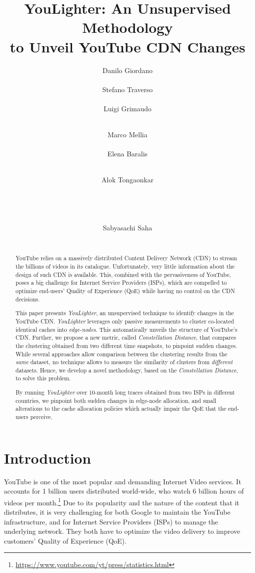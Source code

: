 \documentclass{acm_proc_article-sp}
\title{YouLighter: An Unsupervised Methodology\\
to Unveil YouTube CDN Changes}
\author{
\alignauthor Danilo Giordano\\
       \affaddr{DET, Politecnico di Torino, Italy}\\
       \email{danilo.giordano@polito.it}
\alignauthor Stefano Traverso\\
       \affaddr{DET, Politecnico di Torino, Italy}\\
       \email{stefano.traverso@polito.it}
\alignauthor Luigi Grimaudo\\
       \affaddr{DAUIN, Politecnico di Torino, Italy}\\
       \email{luigi.grimaudo@polito.it} \and
\alignauthor Marco Mellia\\
       \affaddr{DET, Politecnico di Torino, Italy}\\
       \email{marco.mellia@polito.it}
\alignauthor Elena Baralis\\
       \affaddr{DAUIN, Politecnico di Torino, Italy}\\
       \email{elena.baralis@polito.it} \and 
\alignauthor \hspace{-0pt}Alok Tongaonkar\\
       \affaddr{\hspace{-0pt}Symantec, USA}\\
\email{\vspace{-2pt}alok\_tongaonkar@symantec.com} 
\alignauthor \textcolor{white}{.}\\
       \affaddr{\textcolor{white}{.}}\\
       \email{\textcolor{white}{.}}\\
\alignauthor  Sabyasachi Saha\\
       \affaddr{Symantec, USA}\\
\email{sabyasachi\_saha@symantec.com}
}
\newcommand{\tool}{\textit{YouLighter}\xspace}
\newcommand{\distance}{\textit{Constellation Distance}\xspace}
\newcommand{\node}{{edge-node}\xspace}
\newcommand{\nodes}{{edge-nodes}\xspace}
\begin{document}
\maketitle
\begin{abstract} 
YouTube relies on a massively distributed Content Delivery Network (CDN)
to stream the billions of videos in its catalogue.  Unfortunately,  very little information about the design of such CDN is available. This, combined with the pervasiveness of YouTube, poses a big challenge for Internet Service
Providers (ISPs), which are compelled to optimize end-users' Quality of Experience (QoE) while having no control on the CDN decisions.

This paper presents \tool, an
unsupervised technique to identify changes in the
YouTube CDN. \tool leverages only passive
measurements to cluster co-located identical caches
into {\em \nodes}. This automatically unveils the structure of YouTube's CDN. Further, we propose a new metric, called {\em \distance}, that compares the clustering obtained from two different time snapshots, to pinpoint sudden changes.
While several approaches allow comparison between the clustering results from the {\em same} dataset,
no technique allows to measure the similarity of clusters from {\em different} datasets.
Hence, we develop a novel methodology, based on the \distance, to solve this problem.

By running \tool over 10-month long traces obtained from two ISPs in different countries,
we pinpoint both sudden changes in \node allocation, and small alterations to the cache allocation policies which actually impair the QoE that the end-users perceive.
\end{abstract}



\section{Introduction}
\label{sec:intro}

YouTube is one of the most popular and demanding Internet Video services. It accounts for 1 billion users distributed world-wide, who watch 6 billion hours of videos per month.\footnote{\url{https://www.youtube.com/yt/press/statistics.html}}
Due to its popularity and the nature of the content that it distributes, it is very challenging for both Google to maintain the YouTube infrastructure, and for Internet Service Providers (ISPs) to manage the underlying network. They both have to optimize the video delivery to improve customers' Quality of Experience (QoE).
\end{document}
